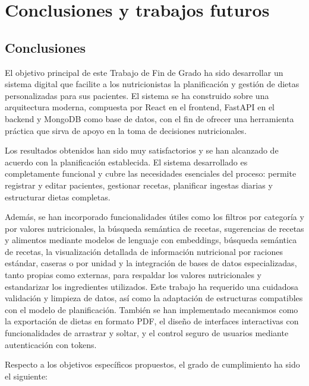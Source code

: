 \chapter{Conclusiones y trabajos futuros}\label{capitulo8}
\section{Conclusiones}

El objetivo principal de este Trabajo de Fin de Grado ha sido desarrollar un sistema digital que facilite a los nutricionistas la planificación y gestión de dietas personalizadas para sus pacientes. El sistema se ha construido sobre una arquitectura moderna, compuesta por React en el frontend, FastAPI en el backend y MongoDB como base de datos, con el fin de ofrecer una herramienta práctica que sirva de apoyo en la toma de decisiones nutricionales.

Los resultados obtenidos han sido muy satisfactorios y se han alcanzado de acuerdo con la planificación establecida. El sistema desarrollado es completamente funcional y cubre las necesidades esenciales del proceso: permite registrar y editar pacientes, gestionar recetas, planificar ingestas diarias y estructurar dietas completas. 

Además, se han incorporado funcionalidades útiles como los filtros por categoría y por valores nutricionales, la búsqueda semántica de recetas, sugerencias de recetas y alimentos mediante modelos de lenguaje con embeddings, búsqueda semántica de recetas, la visualización detallada de información nutricional por raciones estándar, caseras o por unidad y la integración de bases de datos especializadas, tanto propias como externas, para respaldar los valores nutricionales y estandarizar los ingredientes utilizados. Este trabajo ha requerido una cuidadosa validación y limpieza de datos, así como la adaptación de estructuras compatibles con el modelo de planificación. También se han implementado mecanismos como la exportación de dietas en formato PDF, el diseño de interfaces interactivas con funcionalidades de arrastrar y soltar, y el control seguro de usuarios mediante autenticación con tokens.

Respecto a los objetivos específicos propuestos, el grado de cumplimiento ha sido el siguiente:


